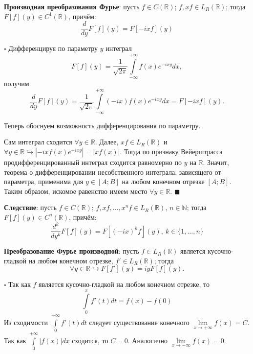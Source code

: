 \documentclass[12pt, a4paper, reqno]{article}
\begin{document}
    \textbf{Производная преобразования Фурье}: пусть $f \in C(\mathbb{R})$; $f, xf \in L_R(\mathbb{R})$;
    тогда $F[f](y) \in C^1(\mathbb{R})$, причём:
    \begin{equation*}
        \frac{d}{dy}F[f](y) = F[-ixf](y)
    \end{equation*}

    $\square$
    Дифференцируя по параметру $y$ интеграл
    \begin{equation*}
        F[f](y) = \frac{1}{\sqrt{2\pi}}\int\limits_{-\infty}^{+\infty} f(x)e^{-ixy}dx,
    \end{equation*}
    получим
    \begin{equation*}
        \frac{d}{dy}F[f](y) = \frac{1}{\sqrt{2\pi}}\int\limits_{-\infty}^{+\infty} (-ix)f(x)e^{-ixy}dx =
        F[-ixf](y).
    \end{equation*}

    Теперь обоснуем возможность дифференцирования по параметру.

    Сам интеграл сходится $\forall y \in \mathbb{R}$. Далее, $xf \in L_R(\mathbb{R})$ и $\forall
    y \in \mathbb{R} \hookrightarrow |-ixf(x)e^{-ixy}| = |xf(x)|$. Тогда по признаку Вейерштрасса
    продифференцированный интеграл сходится равномерно по $y$ на $\mathbb{R}$. Значит, теорема о
    дифференцировании несобственного интеграла, зависящего от параметра, применима для $y \in [A; B]$
    на любом конечном отрезке $[A; B]$. Таким образом, искомое равенство имеем место
    $\forall y \in \mathbb{R}$.
    $\blacksquare$

    \textbf{Следствие}: пусть $f \in C(\mathbb{R})$; $f, xf, \ldots, x^n f \in L_R(\mathbb{R})$,
    $n \in \mathbb{N}$; тогда $F[f](y) \in C^n(\mathbb{R})$, причём:
    \begin{equation*}
        \frac{d^k}{dy^k}F[f](y) = F[(-ix)^k f](y),\ k \in \{1, \ldots, n\}
    \end{equation*}

    \textbf{Преобразование Фурье производной}: пусть $f\in L_R(\mathbb{R})$ является кусочно-гладкой
    на любом конечном отрезке, $f' \in L_R(\mathbb{R})$; тогда
    \begin{equation*}
        \forall y \in \mathbb{R} \hookrightarrow F[f'](y) = iyF[f](y).
    \end{equation*}

    $\square$
    Так как $f$ является кусочно-гладкой на любом конечном отрезке, то
    \begin{equation*}
        \int\limits_{0}^{x} f'(t)dt = f(x) - f(0)
    \end{equation*}
    Из сходимости $\int\limits_{0}^{+\infty} f'(t)dt$ следует существование конечного
    $\lim\limits_{x \to +\infty} f(x) = C$. Так как $\int\limits_{0}^{+\infty} |f(x)|dx$ сходится,
    то $C = 0$. Аналогично $\lim\limits_{x \to -\infty} f(x) = 0$.
\end{document}
